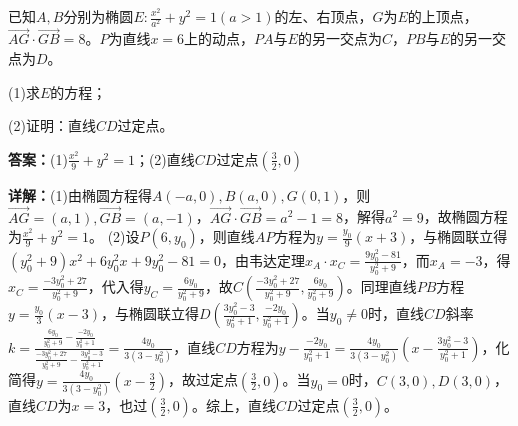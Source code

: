 \begin{question}[points=12]
已知$A,B$分别为椭圆$E:\frac{x^2}{a^2}+y^2=1(a>1)$的左、右顶点，$G$为$E$的上顶点，$\overrightarrow{AG}\cdot\overrightarrow{GB}=8$。$P$为直线$x=6$上的动点，$PA$与$E$的另一交点为$C$，$PB$与$E$的另一交点为$D$。

(1)求$E$的方程；

(2)证明：直线$CD$过定点。
\begin{solution}
\textbf{答案：}(1)$\frac{x^2}{9}+y^2=1$；(2)直线$CD$过定点$\left(\frac{3}{2},0\right)$

\textbf{详解：}(1)由椭圆方程得$A(-a,0),B(a,0),G(0,1)$，则$\overrightarrow{AG}=(a,1),\overrightarrow{GB}=(a,-1)$，$\overrightarrow{AG}\cdot\overrightarrow{GB}=a^2-1=8$，解得$a^2=9$，故椭圆方程为$\frac{x^2}{9}+y^2=1$。
(2)设$P(6,y_0)$，则直线$AP$方程为$y=\frac{y_0}{9}(x+3)$，与椭圆联立得$(y_0^2+9)x^2+6y_0^2x+9y_0^2-81=0$，由韦达定理$x_A\cdot x_C=\frac{9y_0^2-81}{y_0^2+9}$，而$x_A=-3$，得$x_C=\frac{-3y_0^2+27}{y_0^2+9}$，代入得$y_C=\frac{6y_0}{y_0^2+9}$，故$C\left(\frac{-3y_0^2+27}{y_0^2+9},\frac{6y_0}{y_0^2+9}\right)$。同理直线$PB$方程$y=\frac{y_0}{3}(x-3)$，与椭圆联立得$D\left(\frac{3y_0^2-3}{y_0^2+1},\frac{-2y_0}{y_0^2+1}\right)$。当$y_0\neq0$时，直线$CD$斜率$k=\frac{\frac{6y_0}{y_0^2+9}-\frac{-2y_0}{y_0^2+1}}{\frac{-3y_0^2+27}{y_0^2+9}-\frac{3y_0^2-3}{y_0^2+1}}=\frac{4y_0}{3(3-y_0^2)}$，直线$CD$方程为$y-\frac{-2y_0}{y_0^2+1}=\frac{4y_0}{3(3-y_0^2)}\left(x-\frac{3y_0^2-3}{y_0^2+1}\right)$，化简得$y=\frac{4y_0}{3(3-y_0^2)}\left(x-\frac{3}{2}\right)$，故过定点$\left(\frac{3}{2},0\right)$。当$y_0=0$时，$C(3,0),D(3,0)$，直线$CD$为$x=3$，也过$\left(\frac{3}{2},0\right)$。综上，直线$CD$过定点$\left(\frac{3}{2},0\right)$。
\end{solution}
\end{question}

